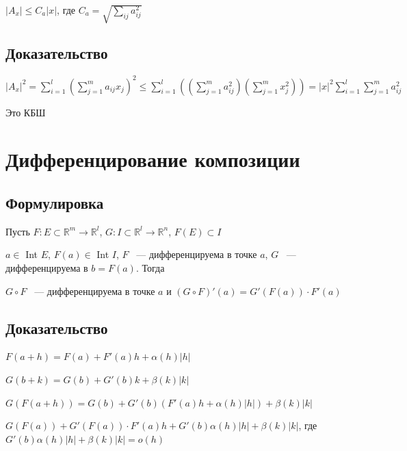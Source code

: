 \documentclass{article}
\begin{document}
            $\left| A_x \right| \leq C_a |x|$, где $C_a = \sqrt{\sum\limits_{ij} a^2_{ij}}$
            
        \subsection{Доказательство}
        
            $\left| A_x \right|^2 = \sum\limits^l_{i = 1} \left( \sum\limits^m_{j = 1} a_{ij} x_j \right)^2 \leq \sum\limits^l_{i = 1} \left( \left( \sum\limits^m_{j = 1} a_{ij}^2 \right) \left( \sum\limits^m_{j = 1} x_j^2 \right) \right) = |x|^2 \sum\limits^l_{i = 1} \sum\limits^m_{j = 1} a_{ij}^2$
            
            Это КБШ
            
    \newpage
    
    \section{Дифференцирование композиции}
    
        \subsection{Формулировка}
        
            Пусть $F : E \subset \mathbb{R}^m \rightarrow \mathbb{R}^l$, $G : I \subset \mathbb{R}^l \rightarrow \mathbb{R}^n$, $F(E) \subset I$
            
            $a \in $ Int $E$, $F(a) \in$ Int $I$, $F$ ~--- дифференцируема в точке $a$, $G$ ~--- дифференцируема в $b = F(a)$. Тогда
            
            $G \circ F$ ~--- дифференцируема в точке $a$ и $\left( G \circ F \right)'(a) = G'\left( F(a) \right) \cdot F'(a)$
            
        \subsection{Доказательство}
        
            $F(a + h) = F(a) + F'(a)h + \alpha(h) |h|$
            
            $G(b + k) = G(b) + G'(b)k + \beta(k) |k|$
            
            $G(F(a + h)) = G(b) + G'(b) (F'(a)h + \alpha(h)|h|) + \beta(k) |k|$
            
            $G(F(a)) + G'(F(a)) \cdot F'(a)h + G'(b)\alpha(h)|h| + \beta(k) |k|$, где $G'(b)\alpha(h)|h| + \beta(k)|k| = o(h)$
            
\end{document}
